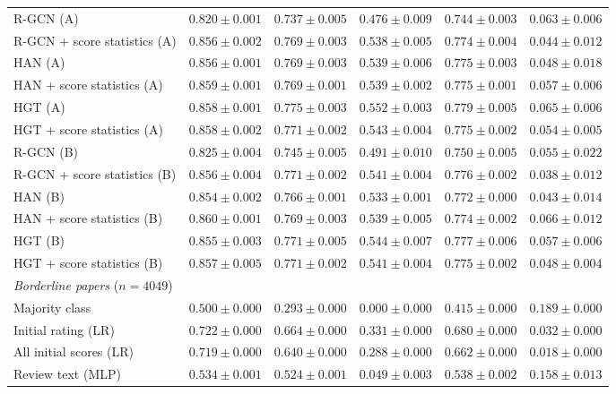 \begin{table}[t]
\begin{tabular}{lccccc}
R-GCN (A) & $0.820 \pm 0.001$ & $0.737 \pm 0.005$ & $0.476 \pm 0.009$ & $0.744 \pm 0.003$ & $0.063 \pm 0.006$ \\
R-GCN + score statistics (A) & $0.856 \pm 0.002$ & $0.769 \pm 0.003$ & $0.538 \pm 0.005$ & $0.774 \pm 0.004$ & $0.044 \pm 0.012$ \\
HAN (A) & $0.856 \pm 0.001$ & $0.769 \pm 0.003$ & $0.539 \pm 0.006$ & $0.775 \pm 0.003$ & $0.048 \pm 0.018$ \\
HAN + score statistics (A) & $0.859 \pm 0.001$ & $0.769 \pm 0.001$ & $0.539 \pm 0.002$ & $0.775 \pm 0.001$ & $0.057 \pm 0.006$ \\
HGT (A) & $0.858 \pm 0.001$ & $0.775 \pm 0.003$ & $0.552 \pm 0.003$ & $0.779 \pm 0.005$ & $0.065 \pm 0.006$ \\
HGT + score statistics (A) & $0.858 \pm 0.002$ & $0.771 \pm 0.002$ & $0.543 \pm 0.004$ & $0.775 \pm 0.002$ & $0.054 \pm 0.005$ \\
R-GCN (B) & $0.825 \pm 0.004$ & $0.745 \pm 0.005$ & $0.491 \pm 0.010$ & $0.750 \pm 0.005$ & $0.055 \pm 0.022$ \\
R-GCN + score statistics (B) & $0.856 \pm 0.004$ & $0.771 \pm 0.002$ & $0.541 \pm 0.004$ & $0.776 \pm 0.002$ & $0.038 \pm 0.012$ \\
HAN (B) & $0.854 \pm 0.002$ & $0.766 \pm 0.001$ & $0.533 \pm 0.001$ & $0.772 \pm 0.000$ & $0.043 \pm 0.014$ \\
HAN + score statistics (B) & $0.860 \pm 0.001$ & $0.769 \pm 0.003$ & $0.539 \pm 0.005$ & $0.774 \pm 0.002$ & $0.066 \pm 0.012$ \\
HGT (B) & $0.855 \pm 0.003$ & $0.771 \pm 0.005$ & $0.544 \pm 0.007$ & $0.777 \pm 0.006$ & $0.057 \pm 0.006$ \\
HGT + score statistics (B) & $0.857 \pm 0.005$ & $0.771 \pm 0.002$ & $0.541 \pm 0.004$ & $0.775 \pm 0.002$ & $0.048 \pm 0.004$ \\
\midrule
\multicolumn{6}{l}{\emph{Borderline papers} ($n = 4049$)} \\
Majority class & $0.500 \pm 0.000$ & $0.293 \pm 0.000$ & $0.000 \pm 0.000$ & $0.415 \pm 0.000$ & $0.189 \pm 0.000$ \\
Initial rating (LR) & $0.722 \pm 0.000$ & $0.664 \pm 0.000$ & $0.331 \pm 0.000$ & $0.680 \pm 0.000$ & $0.032 \pm 0.000$ \\
All initial scores (LR) & $0.719 \pm 0.000$ & $0.640 \pm 0.000$ & $0.288 \pm 0.000$ & $0.662 \pm 0.000$ & $0.018 \pm 0.000$ \\
Review text (MLP) & $0.534 \pm 0.001$ & $0.524 \pm 0.001$ & $0.049 \pm 0.003$ & $0.538 \pm 0.002$ & $0.158 \pm 0.013$ \\

\end{tabular}
\end{table}
